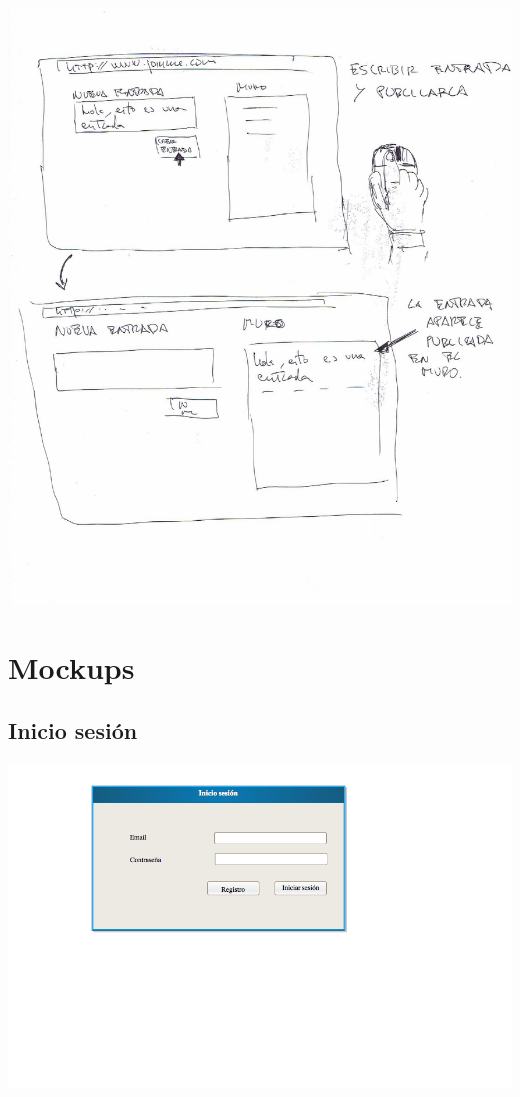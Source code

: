 \documentclass[12pt, a4paper, titlepage]{article}
\begin{document}
	\begin{center}
		\includegraphics[scale=0.5]{Imagenes/nueva_entrada}
	\end{center}

\clearpage
\section{Mockups}

\subsection{Inicio sesión}

\begin{center}
	
	\includegraphics[scale=0.7]{Imagenes/Ventana_inicio_sesion.png}
	
\end{center}
\end{document}
